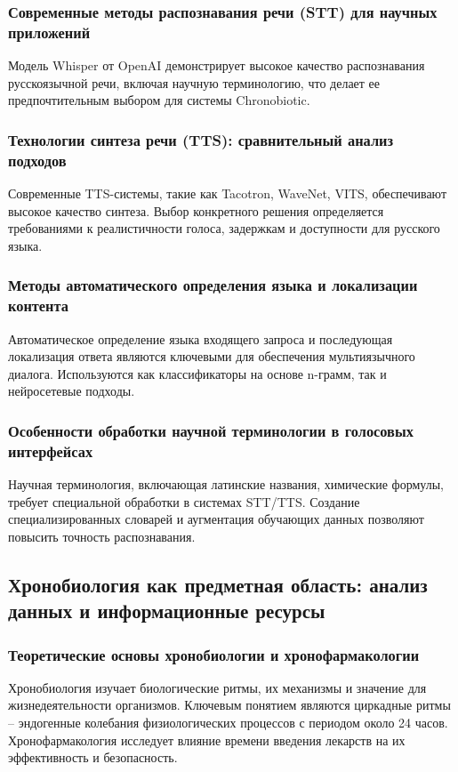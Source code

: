 \documentclass[a4paper,14pt]{extarticle}
\begin{document}
	\subsubsection{Современные методы распознавания речи (STT) для научных приложений}
	Модель Whisper от OpenAI демонстрирует высокое качество распознавания русскоязычной речи, включая научную терминологию, что делает ее предпочтительным выбором для системы Chronobiotic.
	
	\subsubsection{Технологии синтеза речи (TTS): сравнительный анализ подходов}
	Современные TTS-системы, такие как Tacotron, WaveNet, VITS, обеспечивают высокое качество синтеза. Выбор конкретного решения определяется требованиями к реалистичности голоса, задержкам и доступности для русского языка.
	
	\subsubsection{Методы автоматического определения языка и локализации контента}
	Автоматическое определение языка входящего запроса и последующая локализация ответа являются ключевыми для обеспечения мультиязычного диалога. Используются как классификаторы на основе n-грамм, так и нейросетевые подходы.
	
	\subsubsection{Особенности обработки научной терминологии в голосовых интерфейсах}
	Научная терминология, включающая латинские названия, химические формулы, требует специальной обработки в системах STT/TTS. Создание специализированных словарей и аугментация обучающих данных позволяют повысить точность распознавания.
	
	\subsection{Хронобиология как предметная область: анализ данных и информационные ресурсы}
	
	\subsubsection{Теоретические основы хронобиологии и хронофармакологии}
	Хронобиология изучает биологические ритмы, их механизмы и значение для жизнедеятельности организмов. Ключевым понятием являются циркадные ритмы – эндогенные колебания физиологических процессов с периодом около 24 часов. Хронофармакология исследует влияние времени введения лекарств на их эффективность и безопасность.
	
\end{document}

